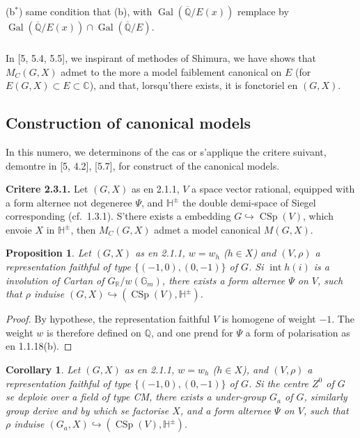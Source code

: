 \documentclass[12pt,a4paper]{article}
\theoremstyle{plain}
\newtheorem{proposition}[theorem]{Proposition}
\newtheorem{corollary}[theorem]{Corollary}
\theoremstyle{definition}
\theoremstyle{remark}
\DeclareMathOperator{\CSp}{CSp}
\DeclareMathOperator{\Gal}{Gal}
\DeclareMathOperator{\Int}{int}
\newcommand{\QQ}{\mathbb{Q}}
\newcommand{\RR}{\mathbb{R}}
\newcommand{\CC}{\mathbb{C}}
\newcommand{\HH}{\mathbb{H}}
\newcommand{\Gm}{\mathbb{G}}
\begin{document}
(b$^*$) same condition that (b), with $\Gal(\overline{\QQ}/E(x))$ remplace by $\Gal(\overline{\QQ}/E(x)) \cap \Gal(\overline{\QQ}/E)$.

\subsubsection{}

In [5, 5.4, 5.5], we inspirant of methodes of Shimura, we have shows that $M_C(G,X)$ admet to the more a model faiblement canonical on $E$ (for $E(G,X) \subset E \subset \CC$), and that, lorsqu'there exists, it is fonctoriel en $(G,X)$.

\subsection{Construction of canonical models}

In this numero, we determinons of the cas or s'applique the critere suivant, demontre in [5, 4.2], [5.7], for construct of the canonical models.

\textbf{Critere 2.3.1.} Let $(G,X)$ as en 2.1.1, $V$ a space vector rational, equipped with a form alternee not degeneree $\Psi$, and $\HH^{\pm}$ the double demi-space of Siegel corresponding (cf.~1.3.1). S'there exists a embedding $G \hookrightarrow \CSp(V)$, which envoie $X$ in $\HH^{\pm}$, then $M_C(G,X)$ admet a model canonical $M(G,X)$.

\begin{proposition}
Let $(G,X)$ as en 2.1.1, $w = w_h$ ($h \in X$) and $(V,\rho)$ a representation faithful of type $\{(-1,0),(0,-1)\}$ of $G$. Si $\Int h(i)$ is a involution of Cartan of $G_{\RR}/w(\Gm_m)$, there exists a form alternee $\Psi$ on $V$, such that $\rho$ induise $(G,X) \hookrightarrow (\CSp(V),\HH^{\pm})$.
\end{proposition}

\begin{proof}
By hypothese, the representation faithful $V$ is homogene of weight $-1$. The weight $w$ is therefore defined on $\QQ$, and one prend for $\Psi$ a form of polarisation as en 1.1.18(b).
\end{proof}

\begin{corollary}
Let $(G,X)$ as en 2.1.1, $w = w_h$ ($h \in X$), and $(V,\rho)$ a representation faithful of type $\{(-1,0),(0,-1)\}$ of $G$. Si the centre $Z^0$ of $G$ se deploie over a field of type CM, there exists a under-group $G_a$ of $G$, similarly group derive and by which se factorise $X$, and a form alternee $\Psi$ on $V$, such that $\rho$ induise $(G_a,X) \hookrightarrow (\CSp(V),\HH^{\pm})$.
\end{corollary}
\end{document}
